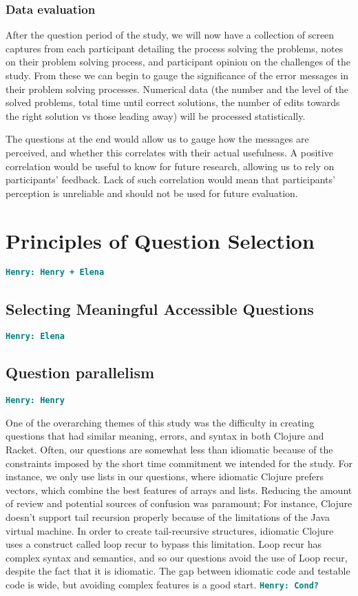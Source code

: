 \documentclass[12pt]{article}
\newcommand{\comment}[1]{{\bf \tt  {#1}}}
\newcommand{\hfcomment}[1]{\textcolor{Teal}{\comment{Henry: {#1}}}}
\begin{document}
\subsubsection{Data evaluation}\label{subsec:evaluation}

After the question period of the study, we will now have a collection of screen captures from each participant detailing the process solving the problems, notes on their problem solving process, and participant opinion on the challenges of the study.
From these we can begin to gauge the significance of the error messages in their problem solving processes. 
Numerical data (the number and the level of the solved problems, total time until correct solutions, the number of edits towards the right solution vs those leading away) will be processed statistically. 

The questions at the end would allow us to gauge how the messages are perceived, and whether this correlates with their actual usefulness. A positive correlation would be useful to know for future research, allowing us to rely on participants' feedback. 
Lack of such correlation would mean that participants' perception is unreliable and should not be used for future evaluation.  

\section{Principles of Question Selection}\label{sec:select}
	\hfcomment{Henry + Elena}
	\subsection{Selecting Meaningful Accessible Questions}\label{sec:meaning}
	\hfcomment{Elena}
	\subsection{Question parallelism}\label{sec:parallel}
	\hfcomment{Henry}
	
	One of the overarching themes of this study was the difficulty in creating questions that had similar meaning, errors, and syntax in both Clojure and Racket. 
	Often, our questions are somewhat less than idiomatic because of the constraints imposed by the short time commitment we intended for the study.
	For instance, we only use lists in our questions, where idiomatic Clojure prefers vectors, which combine the best features of arrays and lists.
	 Reducing the amount of review and potential sources of confusion was paramount; For instance, Clojure doesn't support tail recursion properly because of the limitations of the Java virtual machine.
	 In order to create tail-recursive structures, idiomatic Clojure uses a construct called loop recur to bypass this limitation.
	 Loop recur has complex syntax and semantics, and so our questions avoid the use of Loop recur, despite the fact that it is idiomatic. 
	 The gap between idiomatic code and testable code is wide, but avoiding complex features is a good start. \hfcomment{Cond?}
\end{document}
